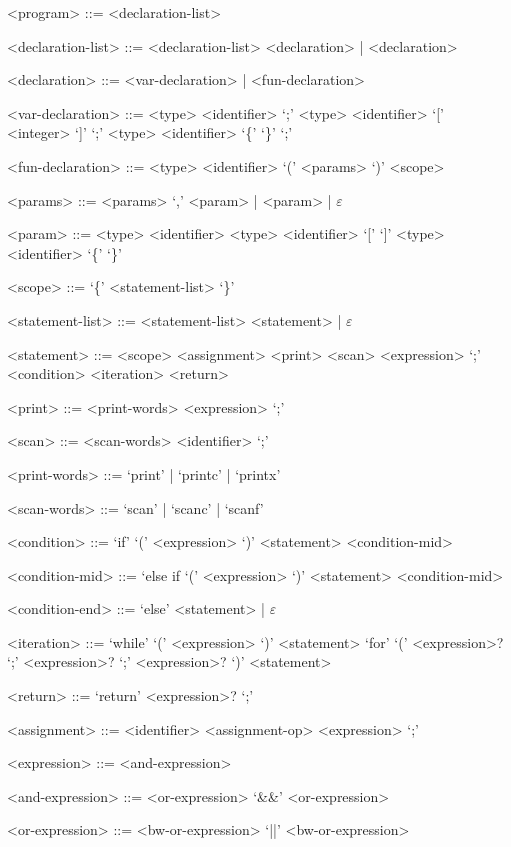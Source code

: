 \documentclass[
	article,			%
	11pt,				%
	oneside,			%
	a4paper,			%
	english,			%
	brazil,				%
	sumario=tradicional
	]{abntex2}
\begin{document}
\begin{grammar}
	
	<program> ::= <declaration-list>
		
	<declaration-list> ::= <declaration-list> <declaration> | <declaration>
	
	<declaration> ::= <var-declaration> | <fun-declaration>
	
	<var-declaration> ::= <type> <identifier> `;'
	\alt <type> <identifier> `[' <integer> `]' `;'
	\alt <type> <identifier> `\{' `\}' `;'
	
	<fun-declaration> ::= <type> <identifier> `(' <params> `)' <scope>
		
	<params> ::= <params> `,' <param> | <param> | $\varepsilon$
	
	<param> ::= <type> <identifier>
	\alt <type> <identifier> `[' `]'
	\alt <type> <identifier> `\{' `\}'
	
	<scope> ::= `\{' <statement-list> `\}'
	
	<statement-list> ::= <statement-list> <statement> | $\varepsilon$
	
	<statement> ::= <scope>
	\alt <var-declaration>
	\alt <assignment>
	\alt <print>
	\alt <scan>
	\alt <expression> `;'
	\alt <condition>
	\alt <iteration>
	\alt <return>
	
	<print> ::= <print-words> <expression> `;'

	<scan> ::= <scan-words> <identifier> `;'

	<print-words> ::= `print' | `printc' | `printx'

	<scan-words> ::= `scan' | `scanc' | `scanf'	

	<condition> ::= `if' `(' <expression> `)' <statement> <condition-mid>
		
	<condition-mid> ::= `else if `(' <expression> `)' <statement> <condition-mid>
	\alt <condition-end>
	
	<condition-end> ::= `else' <statement> | $\varepsilon$
	
	<iteration> ::= `while' `(' <expression> `)' <statement>
	\alt `for' `(' <expression>? `;' <expression>? `;' <expression>? `)' <statement>
	
	<return> ::= `return' <expression>? `;'
	
	<assignment> ::= <identifier> <assignment-op> <expression> `;'
	
	<expression> ::= <and-expression>
	
	<and-expression> ::= <or-expression>
	\alt <and-expression> `&&' <or-expression>
	
	<or-expression> ::= <bw-or-expression>
	\alt <or-expression> `||' <bw-or-expression>
	

\end{grammar}
\end{document}
